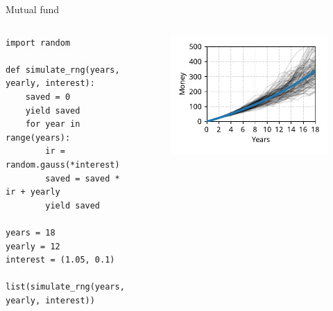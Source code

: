 \documentclass[12pt, aspectratio=149]{beamer}
\theoremstyle{plain}
\begin{document}
\begin{frame}[fragile]{Mutual fund}
\begin{columns}
\begin{column}{0.55\textwidth}
    \begin{center}
     \begin{verbatim} 
import random

def simulate_rng(years, yearly, interest):
    saved = 0
    yield saved
    for year in range(years):
        ir = random.gauss(*interest)
        saved = saved * ir + yearly
        yield saved
        
years = 18
yearly = 12
interest = (1.05, 0.1)

list(simulate_rng(years, yearly, interest))
     \end{verbatim}
     \end{center}
\end{column}
\begin{column}{0.45\textwidth}  %
    \begin{center}
     \begin{figure}
     	\centering
     	\includegraphics[width=0.99\linewidth]{figures/mutual_fund_simulations}
     \end{figure}
     \end{center}
\end{column}
\end{columns}
\end{frame}
\end{document}
